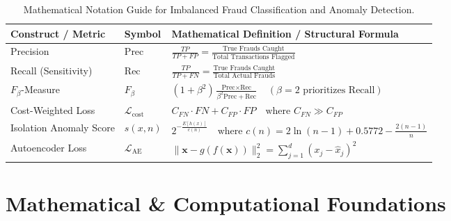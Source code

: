 \begin{table}[htbp]
\centering
\small
\begin{tabularx}{\textwidth}{llX}
\toprule
\textbf{Construct / Metric} & \textbf{Symbol} & \textbf{Mathematical Definition / Structural Formula} \\
\midrule
Precision & $\text{Prec}$ & $\frac{TP}{TP + FP} = \frac{\text{True Frauds Caught}}{\text{Total Transactions Flagged}}$ \\
Recall (Sensitivity) & $\text{Rec}$ & $\frac{TP}{TP + FN} = \frac{\text{True Frauds Caught}}{\text{Total Actual Frauds}}$ \\
$F_\beta$-Measure & $F_\beta$ & $(1 + \beta^2) \frac{\text{Prec} \times \text{Rec}}{\beta^2 \text{Prec} + \text{Rec}} \quad (\beta = 2 \text{ prioritizes Recall})$ \\
Cost-Weighted Loss & $\mathcal{L}_{\text{cost}}$ & $C_{FN} \cdot FN + C_{FP} \cdot FP \quad \text{where } C_{FN} \gg C_{FP}$ \\
Isolation Anomaly Score & $s(x, n)$ & $2^{-\frac{E[h(x)]}{c(n)}} \quad \text{where } c(n) = 2\ln(n - 1) + 0.5772 - \frac{2(n-1)}{n}$ \\
Autoencoder Loss & $\mathcal{L}_{\text{AE}}$ & $\|\mathbf{x} - g(f(\mathbf{x}))\|_2^2 = \sum_{j=1}^d (x_j - \hat{x}_j)^2$ \\
\bottomrule
\end{tabularx}
\caption{Mathematical Notation Guide for Imbalanced Fraud Classification and Anomaly Detection.}
\label{tab:w9_notation}
\end{table}

\section{Mathematical \& Computational Foundations}

